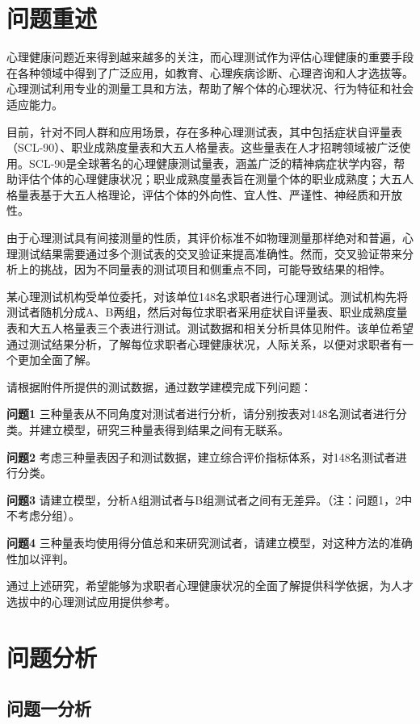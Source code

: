 \documentclass[withoutpreface,bwprint]{cumcmthesis} %
\begin{document}

\section{问题重述}

心理健康问题近来得到越来越多的关注，而心理测试作为评估心理健康的重要手段在各种领域中得到了广泛应用，如教育、心理疾病诊断、心理咨询和人才选拔等。心理测试利用专业的测量工具和方法，帮助了解个体的心理状况、行为特征和社会适应能力。

目前，针对不同人群和应用场景，存在多种心理测试表，其中包括症状自评量表（SCL-90）、职业成熟度量表和大五人格量表。这些量表在人才招聘领域被广泛使用。SCL-90是全球著名的心理健康测试量表，涵盖广泛的精神病症状学内容，帮助评估个体的心理健康状况；职业成熟度量表旨在测量个体的职业成熟度；大五人格量表基于大五人格理论，评估个体的外向性、宜人性、严谨性、神经质和开放性。

由于心理测试具有间接测量的性质，其评价标准不如物理测量那样绝对和普遍，心理测试结果需要通过多个测试表的交叉验证来提高准确性。然而，交叉验证带来分析上的挑战，因为不同量表的测试项目和侧重点不同，可能导致结果的相悖。

某心理测试机构受单位委托，对该单位148名求职者进行心理测试。测试机构先将测试者随机分成A、B两组，然后对每位求职者采用症状自评量表、职业成熟度量表和大五人格量表三个表进行测试。测试数据和相关分析具体见附件。该单位希望通过测试结果分析，了解每位求职者心理健康状况，人际关系，以便对求职者有一个更加全面了解。

请根据附件所提供的测试数据，通过数学建模完成下列问题：

\textbf{问题1} 三种量表从不同角度对测试者进行分析，请分别按表对148名测试者进行分类。并建立模型，研究三种量表得到结果之间有无联系。

\textbf{问题2} 考虑三种量表因子和测试数据，建立综合评价指标体系，对148名测试者进行分类。

\textbf{问题3} 请建立模型，分析A组测试者与B组测试者之间有无差异。（注：问题1，2中不考虑分组）。

\textbf{问题4} 三种量表均使用得分值总和来研究测试者，请建立模型，对这种方法的准确性加以评判。


通过上述研究，希望能够为求职者心理健康状况的全面了解提供科学依据，为人才选拔中的心理测试应用提供参考。


\section{问题分析}

\subsection{问题一分析}
\end{document}
